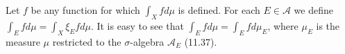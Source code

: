 Let $f$ be any function for which $\int_X f d\mu$ is defined. For each $E \in \mathcal{A}$ we define $\int_E f d\mu = \int_X \xi_E f d\mu$. It is easy to see that $\int_E f d\mu = \int_E f d\mu_E$, where $\mu_E$ is the measure $\mu$ restricted to the $\sigma$-algebra $\mathcal{A}_E$ (11.37).
